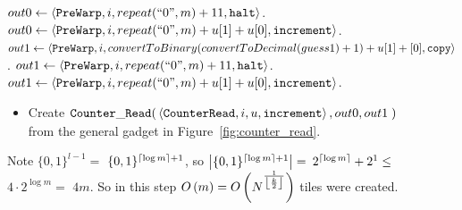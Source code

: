 \begin{itemize}
\begin{algorithm}[H]
\begin{algorithmic}[1]
                \Else
                        \State $out0 \gets \left\langle {\tt PreWarp}, i, repeat(``0", m) + 11, {\tt halt} \right\rangle$.
                    \Else
                        \State $out0 \gets \left\langle {\tt PreWarp}, i, repeat(``0", m) + u[1] + u[0], {\tt increment} \right\rangle$.
                    \EndIf
                \EndIf
                    \State $out1 \gets \left\langle {\tt PreWarp}, i, convertToBinary(convertToDecimal(guess1) + 1) + u[1] + [0], {\tt copy} \right\rangle$.
                \Else
                        \State $out1 \gets \left\langle {\tt PreWarp}, i, repeat(``0", m) + 11, {\tt halt} \right\rangle$.
                    \Else
                        \State $out1 \gets \left\langle {\tt PreWarp}, i, repeat(``0", m) + u[1] + u[0], {\tt increment} \right\rangle$.
                    \EndIf
                \EndIf
            \EndFunction
        \end{algorithmic}
    \end{algorithm}

    \begin{itemize}
        \item
        Create $\begin{aligned}[t]
                   \cread(& \left\langle {\tt CounterRead}, i, u, {\tt increment} \right\rangle, out0, out1 \;)
               \end{aligned}$\\from the general gadget in Figure~\ref{fig:counter_read}.
    \end{itemize}
    Note $\{0, 1 \}^{l-1} =$ $\{0, 1\}^{\ceil*{\log m} + 1}$, so
    $\left| {\{0, 1\}^{\ceil*{\log m} + 1}} \right| =$
    $2^{\ceil*{\log m}} + 2^1 \leq$
    $4 \cdot 2^{\log m} =$
    $4m$.
    So in this step $O\left(m \right) = O\left( \upperbound \right)$ tiles were created.

\end{itemize}

